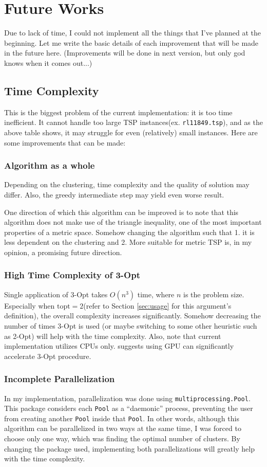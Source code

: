 \documentclass[a4paper]{article}
\begin{document}
{\section{Future Works}
Due to lack of time, I could not implement all the things that I've planned at the beginning.
Let me write the basic details of each improvement that will be made in the future here.
(Improvements will be done in next version, but only god knows when it comes out...)

\subsection{Time Complexity}
This is the biggest problem of the current implementation: it is too time inefficient.
It cannot handle too large TSP instances(ex. \texttt{rl11849.tsp}), and as the above table shows, it may struggle for even (relatively) small instances.
Here are some improvements that can be made:


\subsubsection{Algorithm as a whole}
Depending on the clustering, time complexity and the quality of solution may differ.
Also, the greedy intermediate step may yield even worse result.

One direction of which this algorithm can be improved is to note that this algorithm does not make use of the triangle inequality, one of the most important properties of a metric space.
Somehow changing the algorithm such that 1. it is less dependent on the clustering and 2. More suitable for metric TSP is, in my opinion, a promising future direction.

\subsubsection{High Time Complexity of 3-Opt}
Single application of $3$-Opt takes $O(n^3)$ time, where $n$ is the problem size.
Especially when $\text{topt} = 2$(refer to Section \ref{sec:usage} for this argument's definition), the overall complexity increases significantly.
Somehow decreasing the number of times 3-Opt is used (or maybe switching to some other heuristic such as 2-Opt) will help with the time complexity.
Also, note that current implementation utilizes CPUs only.
\cite{RS12, QC18} suggests using GPU can significantly accelerate 3-Opt procedure.


\subsubsection{Incomplete Parallelization}
\label{subsubsec:parallel}
In my implementation, parallelization was done using \texttt{multiprocessing.Pool}.
This package considers each \texttt{Pool} as a \enquote{daemonic} process, preventing the user from creating another \texttt{Pool} inside that \texttt{Pool}.
In other words, although this algorithm can be parallelized in two ways at the same time, I was forced to choose only one way, which was finding the optimal number of clusters.
By changing the package used, implementing both parallelizations will greatly help with the time complexity.


}
\end{document}

